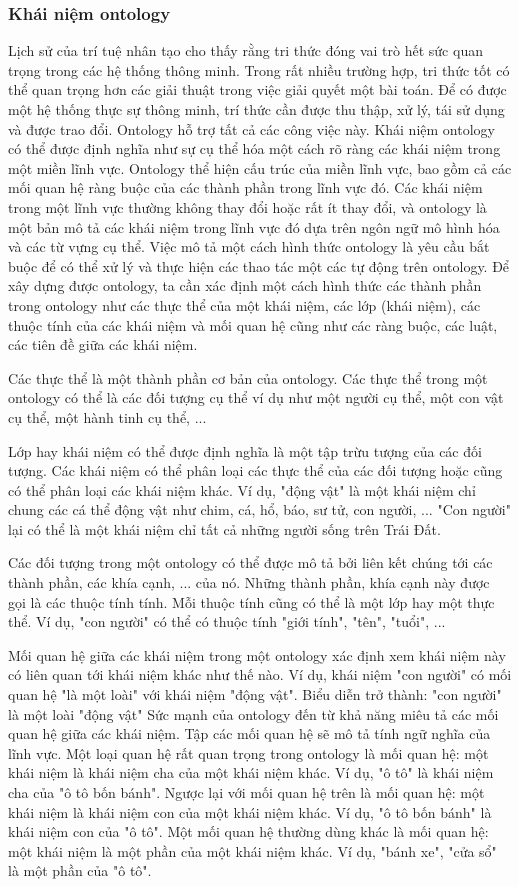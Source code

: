 \subsubsection{Khái niệm ontology}
Lịch sử của trí tuệ nhân tạo cho thấy rằng tri thức đóng vai trò hết sức quan trọng trong các hệ thống thông minh. Trong rất nhiều trường hợp, tri thức tốt có thể quan trọng hơn các giải thuật trong việc giải quyết một bài toán. Để có được một hệ thống thực sự thông minh, trí thức cần được thu thập, xử lý, tái sử dụng và được trao đổi. Ontology hỗ trợ tất cả các công việc này. Khái niệm ontology có thể được định nghĩa như sự cụ thể hóa một cách rõ ràng các khái niệm trong một miền lĩnh vực. Ontology thể hiện cấu trúc của miền lĩnh vực, bao gồm cả các mối quan hệ ràng buộc của các thành phần trong lĩnh vực đó. Các khái niệm trong một lĩnh vực thường không thay đổi hoặc rất ít thay đổi, và ontology là một bản mô tả các khái niệm trong lĩnh vực đó dựa trên ngôn ngữ mô hình hóa và các từ vựng cụ thể. Việc mô tả một cách hình thức ontology là yêu cầu bắt buộc để có thể xử lý và thực hiện các thao tác một các tự động trên ontology. Để xây dựng được ontology, ta cần xác định một cách hình thức các thành phần trong ontology như các thực thể của một khái niệm, các lớp (khái niệm), các thuộc tính của các khái niệm và mối quan hệ cũng như các ràng buộc, các luật, các tiên đề giữa các khái niệm. 

Các thực thể là một thành phần cơ bản của ontology. Các thực thể trong một ontology có thể là các đối tượng cụ thể ví dụ như một người cụ thể, một con vật cụ thể, một hành tinh cụ thể, ... 

Lớp hay khái niệm có thể được định nghĩa là một tập trừu tượng của các đối tượng. Các khái niệm có thể phân loại các thực thể của các đối tượng hoặc cũng có thể phân loại các khái niệm khác. Ví dụ, "động vật" là một khái niệm chỉ chung các cá thể động vật như chim, cá, hổ, báo, sư tử, con người, ... "Con người" lại có thể là một khái niệm chỉ tất cả những người sống trên Trái Đất. 

Các đối tượng trong một ontology có thể được mô tả bởi liên kết chúng tới các thành phần, các khía cạnh, ... của nó. Những thành phần, khía cạnh này được gọi là các thuộc tính tính. Mỗi thuộc tính cũng có thể là một lớp hay một thực thể. Ví dụ, "con người" có thể có thuộc tính "giới tính", "tên", "tuổi", ...
 
Mối quan hệ giữa các khái niệm trong một ontology xác định xem khái niệm này có liên quan tới khái niệm khác như thế nào. Ví dụ, khái niệm "con người" có mối quan hệ "là một loài" với khái niệm "động vật". Biểu diễn trở thành:
"con người" là một loài "động vật" 
Sức mạnh của ontology đến từ khả năng miêu tả các mối quan hệ giữa các khái niệm. Tập các mối quan hệ sẽ mô tả tính ngữ nghĩa của lĩnh vực. Một loại quan hệ rất quan trọng trong ontology là mối quan hệ: một khái niệm là khái niệm cha của một khái niệm khác. Ví dụ, "ô tô" là khái niệm cha của "ô tô bốn bánh". Ngược lại với mối quan hệ trên là mối quan hệ: một khái niệm là khái niệm con của một khái niệm khác. Ví dụ, "ô tô bốn bánh" là khái niệm con của "ô tô". Một mối quan hệ thường dùng khác là mối quan hệ: một khái niệm là một phần của một khái niệm khác. Ví dụ, "bánh xe", "cửa sổ" là một phần của "ô tô". 

